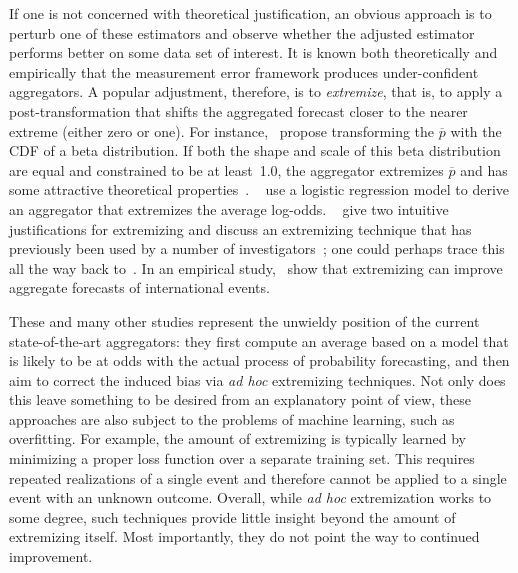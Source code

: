 \documentclass[12pt]{article}
\theoremstyle{definition}
\theoremstyle{definition}
\def\pb{\overline{p}}
\begin{document}
If one is not concerned with theoretical justification, an obvious
approach is to perturb one of these estimators and observe whether the
adjusted estimator performs better on some data set of interest.  It
is known both theoretically and empirically that the measurement error
framework produces under-confident aggregators.  A popular adjustment,
therefore, is to {\em extremize}, that is, to apply a
post-transformation that shifts the aggregated forecast closer to the
nearer extreme (either zero or one).  For instance,~\citet{Ranjan08}
propose transforming the $\pb$ with the CDF of a
beta distribution.  If both the shape and scale of this beta
distribution are equal and constrained to be at least~1.0, the
aggregator extremizes $\pb$ and has some attractive theoretical
properties~\citep{Wallsten2001}.  ~\citet{satopaa} use a logistic
regression model to derive an aggregator that extremizes the average
log-odds.  ~\citet{baron2014two} give two intuitive justifications for
extremizing and discuss an extremizing technique that has previously
been used by a number of investigators~\citep{Erev1994,
shlomi2010subjective}; one could perhaps trace this all the way back
to~\citet{karmarkar1978subjectively}.  In an empirical
study,~\citet{mellers2014psychological} show that extremizing can
improve aggregate forecasts of international events.

These and many other studies represent the unwieldy position of the
 current state-of-the-art aggregators: they first compute an average 
 based on a model that is
likely to be at odds with the actual process of probability
forecasting, and  then aim to correct the induced bias  via {\em ad hoc}
extremizing techniques.
%
Not only does this leave something to be desired from an explanatory
point of view, these approaches are also subject to the problems of
machine learning, such as overfitting.  For example, the amount of 
extremizing is typically learned by minimizing a
proper loss function over a separate training set. This requires repeated realizations
of a single event and therefore cannot be applied to a single event with an unknown outcome. Overall, while {\em ad hoc}
extremization works to some degree, such techniques provide little
insight beyond the amount of extremizing itself. Most importantly, they do not point
the way to continued improvement.
\end{document}
